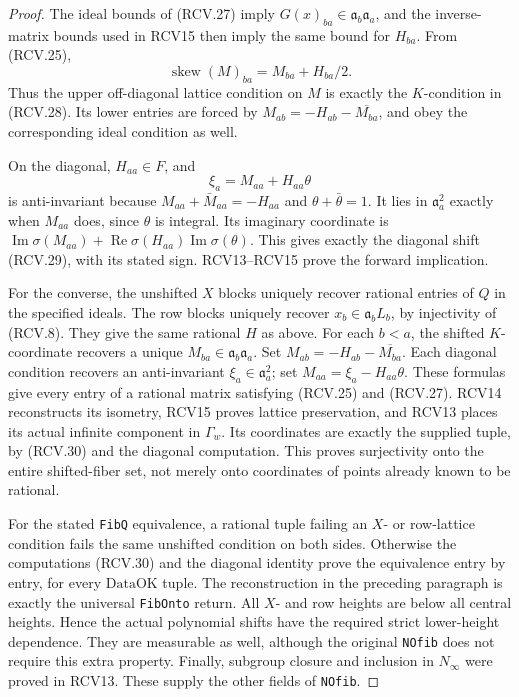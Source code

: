 \documentclass[11pt,a4paper]{article}
\numberwithin{equation}{section}
\theoremstyle{remark}\newtheorem{remark}[theorem]{Remark}
\begin{document}
\begin{proof}
The ideal bounds of (RCV.27) imply
\(G(x)_{ba}\in\mathfrak a_b\mathfrak a_a\), and the
inverse-matrix bounds used in RCV15 then imply the same bound for
\(H_{ba}\).  From (RCV.25),
\[
 \operatorname{skew}(M)_{ba}=M_{ba}+H_{ba}/2.
\tag{RCV.30}
\]
Thus the upper off-diagonal lattice condition on \(M\) is
exactly the \(K\)-condition in (RCV.28).  Its lower entries are
forced by \(M_{ab}=-H_{ab}-\overline{M_{ba}}\), and obey
the corresponding ideal condition as well.

On the diagonal, \(H_{aa}\in F\), and
\[
                  \xi_a=M_{aa}+H_{aa}\theta
\]
is anti-invariant because \(M_{aa}+\bar M_{aa}=-H_{aa}\)
and \(\theta+\bar\theta=1\).  It lies in \(\mathfrak a_a^2\)
exactly when \(M_{aa}\) does, since \(\theta\) is integral.
Its imaginary coordinate is
\(\operatorname{Im}\sigma(M_{aa})+
 \operatorname{Re}\sigma(H_{aa})\operatorname{Im}\sigma(\theta)\).
This gives exactly the diagonal shift (RCV.29), with its stated
sign.  RCV13--RCV15 prove the forward implication.

For the converse, the unshifted \(X\) blocks uniquely recover
rational entries of \(Q\) in the specified ideals.  The row
blocks uniquely recover \(x_b\in\mathfrak a_bL_b\), by
injectivity of (RCV.8).  They give the same rational \(H\) as
above.  For each \(b<a\), the shifted \(K\)-coordinate
recovers a unique \(M_{ba}\in\mathfrak a_b\mathfrak a_a\).
Set \(M_{ab}=-H_{ab}-\overline{M_{ba}}\).  Each diagonal
condition recovers an anti-invariant \(\xi_a\in\mathfrak a_a^2\);
set \(M_{aa}=\xi_a-H_{aa}\theta\).  These formulas give
every entry of a rational matrix satisfying (RCV.25) and (RCV.27).
RCV14 reconstructs its isometry, RCV15 proves lattice preservation,
and RCV13 places its actual infinite component in \(\Gamma_w\).
Its coordinates are exactly the supplied tuple, by (RCV.30) and
the diagonal computation.  This proves surjectivity onto the entire
shifted-fiber set, not merely onto coordinates of points already
known to be rational.

For the stated \texttt{Fib\allowbreak Q} equivalence, a rational tuple failing
an \(X\)- or row-lattice condition fails the same unshifted
condition on both sides.  Otherwise the computations (RCV.30) and
the diagonal identity prove the equivalence entry by entry, for
every \(\mathrm{DataOK}\) tuple.  The reconstruction in the
preceding paragraph is exactly the universal \texttt{Fib\allowbreak Onto}
return.  All \(X\)- and row heights are below all central heights.
Hence the actual polynomial shifts have the required strict
lower-height dependence.  They are measurable as well, although
the original \texttt{NOfib} does not require this extra property.
Finally, subgroup closure and inclusion in \(N_\infty\) were
proved in RCV13.  These supply the other fields of \texttt{NOfib}.
\end{proof}
\end{document}
